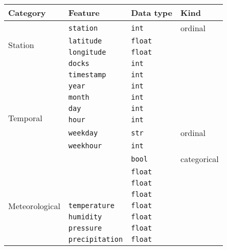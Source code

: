 
\begin{table}
  \newcommand{\tablefeaturesrow}[4]{#1 & #2 & #3 & #4 \\}
  \centering
  \begin{tabular}{llll}
    \toprule

    \tablefeaturesrow{Category}{Feature}{Data type}{Kind}

    \midrule

    \tablefeaturesrow{\multirow{4}{*}{Station}}{\texttt{station}}{\texttt{int}}{ordinal}

    \tablefeaturesrow{}{\texttt{latitude}}{\texttt{float}}{}

    \tablefeaturesrow{}{\texttt{longitude}}{\texttt{float}}{}

    \tablefeaturesrow{}{\texttt{docks}}{\texttt{int}}{}

    \midrule

    \tablefeaturesrow{\multirow{8}{*}{Temporal}}{\texttt{timestamp}}{\texttt{int}}{}

    \tablefeaturesrow{}{\texttt{year}}{\texttt{int}}{}

    \tablefeaturesrow{}{\texttt{month}}{\texttt{int}}{}

    \tablefeaturesrow{}{\texttt{day}}{\texttt{int}}{}

    \tablefeaturesrow{}{\texttt{hour}}{\texttt{int}}{}

    \tablefeaturesrow{}{\texttt{weekday}}{\texttt{str}}{ordinal}

    \tablefeaturesrow{}{\texttt{weekhour}}{\texttt{int}}{}

    \tablefeaturesrow{}{\texttt{\isholiday}}{\texttt{bool}}{categorical}

    \midrule

    \tablefeaturesrow{\multirow{7}{*}{Meteorological}}{\texttt{\windspeedmax}}{\texttt{float}}{}

    \tablefeaturesrow{}{\texttt{\windspeedavg}}{\texttt{float}}{}

    \tablefeaturesrow{}{\texttt{\winddirection}}{\texttt{float}}{}

    \tablefeaturesrow{}{\texttt{temperature}}{\texttt{float}}{}

    \tablefeaturesrow{}{\texttt{humidity}}{\texttt{float}}{}

    \tablefeaturesrow{}{\texttt{pressure}}{\texttt{float}}{}

    \tablefeaturesrow{}{\texttt{precipitation}}{\texttt{float}}{}

    \midrule


\end{tabular}
\end{table}
